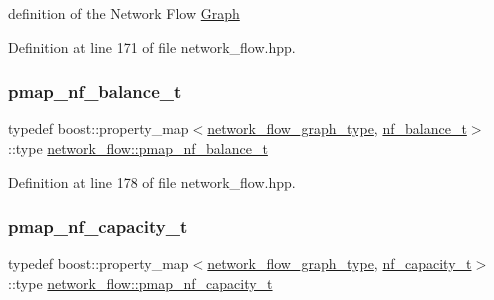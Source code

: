 definition of the Network Flow \hyperlink{structGraph}{Graph} 



Definition at line 171 of file network\+\_\+flow.\+hpp.

\mbox{\label{classnetwork__flow_adb6c2e7def8309b3a5f660dd40a758e8}} 
\subsubsection{\texorpdfstring{pmap\+\_\+nf\+\_\+balance\+\_\+t}{pmap\_nf\_balance\_t}}
{\footnotesize\ttfamily typedef boost\+::property\+\_\+map$<$\hyperlink{classnetwork__flow_abfdb8d1baba183c2b121f8c078b9b640}{network\+\_\+flow\+\_\+graph\+\_\+type}, \hyperlink{structnetwork__flow_1_1nf__balance__t}{nf\+\_\+balance\+\_\+t}$>$\+::type \hyperlink{classnetwork__flow_adb6c2e7def8309b3a5f660dd40a758e8}{network\+\_\+flow\+::pmap\+\_\+nf\+\_\+balance\+\_\+t}\hspace{0.3cm}{\ttfamily [private]}}



Definition at line 178 of file network\+\_\+flow.\+hpp.

\mbox{\label{classnetwork__flow_a234594983ab43e779b43424c829cdcca}} 
\subsubsection{\texorpdfstring{pmap\+\_\+nf\+\_\+capacity\+\_\+t}{pmap\_nf\_capacity\_t}}
{\footnotesize\ttfamily typedef boost\+::property\+\_\+map$<$\hyperlink{classnetwork__flow_abfdb8d1baba183c2b121f8c078b9b640}{network\+\_\+flow\+\_\+graph\+\_\+type}, \hyperlink{structnetwork__flow_1_1nf__capacity__t}{nf\+\_\+capacity\+\_\+t}$>$\+::type \hyperlink{classnetwork__flow_a234594983ab43e779b43424c829cdcca}{network\+\_\+flow\+::pmap\+\_\+nf\+\_\+capacity\+\_\+t}\hspace{0.3cm}{\ttfamily [private]}}



